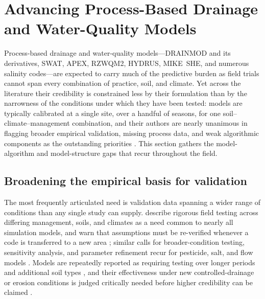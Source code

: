 \section{Advancing Process-Based Drainage and Water-Quality Models}

Process-based drainage and water-quality models---DRAINMOD and its
derivatives, SWAT, APEX, RZWQM2, HYDRUS, MIKE~SHE, and numerous salinity
codes---are expected to carry much of the predictive burden as field trials
cannot span every combination of practice, soil, and climate. Yet across the
literature their credibility is constrained less by their formulation than by
the narrowness of the conditions under which they have been tested: models are
typically calibrated at a single site, over a handful of seasons, for one
soil--climate--management combination, and their authors are nearly unanimous
in flagging broader empirical validation, missing process data, and weak
algorithmic components as the outstanding priorities
\parencite{Li2006,Qi2015,Youssef2006,Radcliffe2015,SKAGGS1994}. This section
gathers the model-algorithm and model-structure gaps that recur throughout the
field.

\subsection{Broadening the empirical basis for validation}

The most frequently articulated need is validation data spanning a wider range
of conditions than any single study can supply. \textcite{Youssef2006} describe
rigorous field testing across differing management, soils, and climates as a
need common to nearly all simulation models, and warn that assumptions must be
re-verified whenever a code is transferred to a new area
\parencite{Kelleners2000}; similar calls for broader-condition testing,
sensitivity analysis, and parameter refinement recur for pesticide, salt, and
flow models \parencite{Branger2009,Hirekhan2007,Yang2008b,Xian2017}. Models are
repeatedly reported as requiring testing over longer periods and additional soil
types \parencite{Salazar2009,Li2026}, and their effectiveness under new
controlled-drainage or erosion conditions is judged critically needed before
higher credibility can be claimed \parencite{Negm2017,Turunen2020}.

